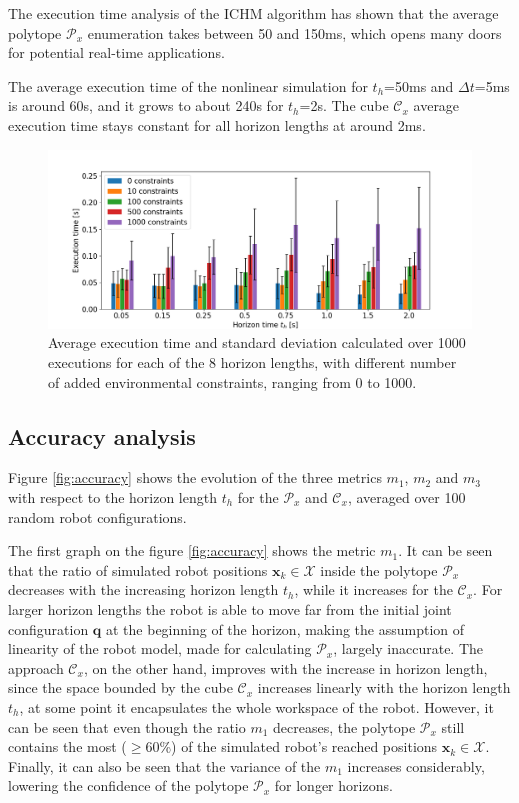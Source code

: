 The execution time analysis of the ICHM algorithm has shown that the average polytope $\mathcal{P}_x$ enumeration takes between 50 and 150ms, which opens many doors for potential real-time applications.

The average execution time of the nonlinear simulation for $t_h$=50ms and $\Delta t$=5ms is around 60s, and it grows to about 240s for $t_h$=2s. The cube $\mathcal{C}_x$ average execution time stays constant for all horizon lengths at around 2ms.

\begin{figure}[!t]
    \centering
    \includegraphics[width=0.75\linewidth]{Papers/images/time_constriant.png}
    \caption{Average execution time and standard deviation calculated over 1000 executions for each of the 8 horizon lengths, with different number of added environmental constraints, ranging from 0 to 1000.}
    \label{fig:exec_time_constraints}
    
\end{figure}


\subsection{Accuracy analysis}

Figure \ref{fig:accuracy} shows the evolution of the three metrics $m_1$, $m_2$ and $m_3$ with respect to the horizon length $t_h$ for the $\mathcal{P}_x$ and $\mathcal{C}_x$, averaged over 100 random robot configurations. 

The first graph on the figure \ref{fig:accuracy} shows the metric $m_1$. It can be seen that the ratio of simulated robot positions $\bm{x}_k \in \mathcal{X}$ inside the polytope $\mathcal{P}_x$ decreases with the increasing horizon length $t_h$, while it increases for the $\mathcal{C}_x$. For larger horizon lengths the robot is able to move far from the initial joint configuration $\bm{q}$ at the beginning of the horizon, making the assumption of linearity of the robot model, made for calculating $\mathcal{P}_x$, largely inaccurate. The approach $\mathcal{C}_x$, on the other hand, improves with the increase in horizon length, since the space bounded by the cube $\mathcal{C}_x$ increases linearly with the horizon length $t_h$, at some point it encapsulates the whole workspace of the robot. However, it can be seen that even though the ratio $m_1$ decreases, the polytope $\mathcal{P}_x$ still contains the most ($\geq$60\%) of the simulated robot's reached positions $\bm{x}_k\in\mathcal{X}$. Finally, it can also be seen that the variance of the $m_1$ increases considerably, lowering the confidence of the polytope $\mathcal{P}_x$ for longer horizons.

